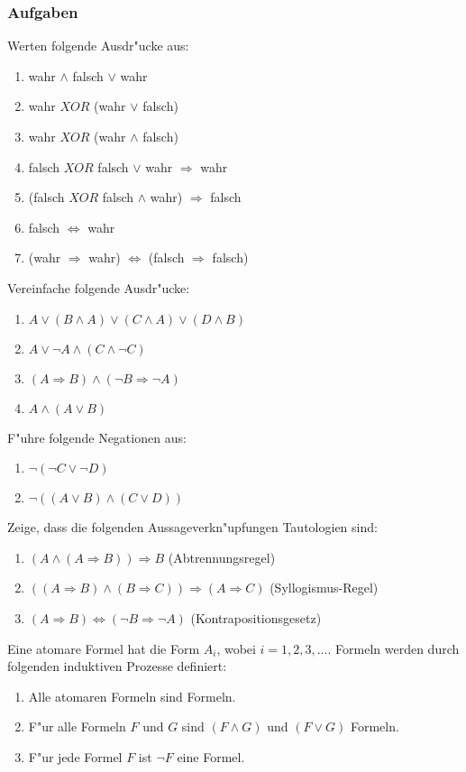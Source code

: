 \subsubsection{Aufgaben}
Werten folgende Ausdr"ucke aus:
\begin{enumerate}
	\item wahr $\land$ falsch $\lor$ wahr
	\item wahr $XOR$ (wahr $\lor$ falsch)
	\item wahr $XOR$ (wahr $\land$ falsch)
	\item falsch $XOR$ falsch $\lor$ wahr $\Rightarrow$ wahr
	\item (falsch $XOR$ falsch $\land$ wahr) $\Rightarrow$ falsch
	\item falsch $\iff$ wahr
	\item (wahr $\Rightarrow$ wahr) $\iff$ (falsch $\Rightarrow$ falsch)
\end{enumerate}
Vereinfache folgende Ausdr"ucke:
\begin{enumerate}
	\item $A \lor (B \land A) \lor (C \land A) \lor (D \land B)$
	\item $A \lor \neg A \land (C \land \neg C)$
	\item $(A \Rightarrow B) \land (\neg B \Rightarrow \neg A)$
	\item $A \land (A \lor B)$
\end{enumerate}
F"uhre folgende Negationen aus:
\begin{enumerate}
	\item $\neg (\neg C \lor \neg D)$
	\item $\neg ((A \lor B) \land (C \lor D))$
\end{enumerate}
Zeige, dass die folgenden Aussageverkn"upfungen Tautologien sind:
\begin{enumerate}
	\item $(A \land (A \Rightarrow B)) \Rightarrow B$ (Abtrennungsregel)
	\item $((A \Rightarrow B) \land (B \Rightarrow C)) \Rightarrow (A \Rightarrow C)$ (Syllogismus-Regel)
	\item $(A \Rightarrow B) \iff (\neg B \Rightarrow \neg A)$ (Kontrapositionsgesetz)
\end{enumerate}

Eine atomare Formel hat die Form $A_i$, wobei $i = 1,2,3,\ldots$. Formeln werden durch folgenden induktiven Prozesse definiert:
\begin{enumerate}
\item Alle atomaren Formeln sind Formeln.
\item F"ur alle Formeln $F$ und $G$ sind $(F \land G)$ und $(F \lor G)$ Formeln.
\item F"ur jede Formel $F$ ist $\neg F$ eine Formel.
\end{enumerate}

